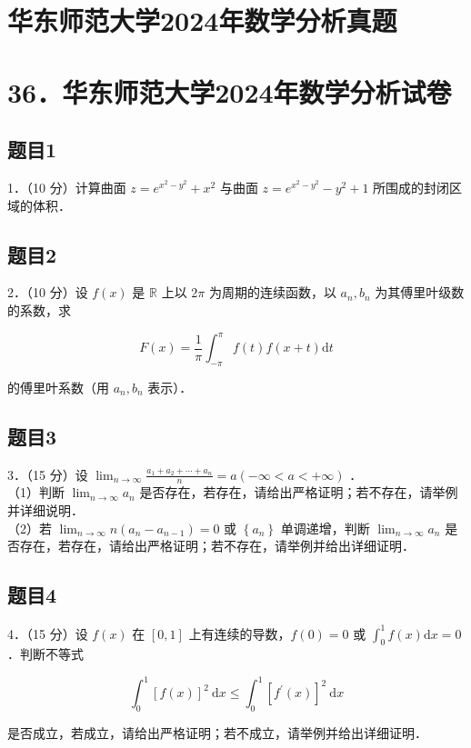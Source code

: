 \documentclass{article}
\begin{document}
\section*{华东师范大学2024年数学分析真题}
\section*{36．华东师范大学2024年数学分析试卷}

\subsection{题目1}
1．（10 分）计算曲面 \(z=e^{x^{2}-y^{2}}+x^{2}\) 与曲面 \(z=e^{x^{2}-y^{2}}-y^{2}+1\) 所围成的封闭区域的体积．

\subsection{题目2}
2．（10 分）设 \(f(x)\) 是 \(\mathbb{R}\) 上以 \(2 \pi\) 为周期的连续函数，以 \(a_{n}, b_{n}\) 为其傅里叶级数的系数，求

\[
F(x)=\frac{1}{\pi} \int_{-\pi}^{\pi} f(t) f(x+t) \mathrm{d} t
\]

的傅里叶系数（用 \(a_{n}, b_{n}\) 表示）．

\subsection{题目3}
3．（15 分）设 \(\lim _{n \rightarrow \infty} \frac{a_{1}+a_{2}+\cdots+a_{n}}{n}=a(-\infty<a<+\infty)\) ．\\
（1）判断 \(\lim _{n \rightarrow \infty} a_{n}\) 是否存在，若存在，请给出严格证明；若不存在，请举例并详细说明．\\
（2）若 \(\lim _{n \rightarrow \infty} n\left(a_{n}-a_{n-1}\right)=0\) 或 \(\left\{a_{n}\right\}\) 单调递增，判断 \(\lim _{n \rightarrow \infty} a_{n}\) 是否存在，若存在，请给出严格证明；若不存在，请举例并给出详细证明．

\subsection{题目4}
4．（15 分）设 \(f(x)\) 在 \([0,1]\) 上有连续的导数，\(f(0)=0\) 或 \(\int_{0}^{1} f(x) \mathrm{d} x=0\) ．判断不等式

\[
\int_{0}^{1}[f(x)]^{2} \mathrm{~d} x \leq \int_{0}^{1}\left[f^{\prime}(x)\right]^{2} \mathrm{~d} x
\]

是否成立，若成立，请给出严格证明；若不成立，请举例并给出详细证明．
\end{document}

